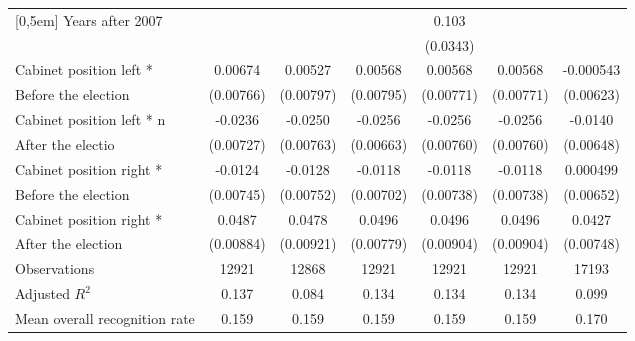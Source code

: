 \begin{table}[!ht]
\begin{tabular}{l*{6}{c}}
[0,5em]
Years after 2007    &                     &                     &                     &       0.103\sym{**} &                     &                     \\
                    &                     &                     &                     &    (0.0343)         &                     &                     \\
[0,5em]
Cabinet position left * &     0.00674         &     0.00527         &     0.00568         &     0.00568         &     0.00568         &   -0.000543         \\
Before the election                    &   (0.00766)         &   (0.00797)         &   (0.00795)         &   (0.00771)         &   (0.00771)         &   (0.00623)         \\
[0,5em]
Cabinet position left * n&     -0.0236\sym{**} &     -0.0250\sym{**} &     -0.0256\sym{***}&     -0.0256\sym{**} &     -0.0256\sym{**} &     -0.0140\sym{*}  \\
After the electio                    &   (0.00727)         &   (0.00763)         &   (0.00663)         &   (0.00760)         &   (0.00760)         &   (0.00648)         \\
[0,5em]
Cabinet position right * &     -0.0124         &     -0.0128         &     -0.0118         &     -0.0118         &     -0.0118         &    0.000499         \\
Before the election                    &   (0.00745)         &   (0.00752)         &   (0.00702)         &   (0.00738)         &   (0.00738)         &   (0.00652)         \\
[0,5em]
Cabinet position right *&      0.0487\sym{***}&      0.0478\sym{***}&      0.0496\sym{***}&      0.0496\sym{***}&      0.0496\sym{***}&      0.0427\sym{***}\\
 After the election                    &   (0.00884)         &   (0.00921)         &   (0.00779)         &   (0.00904)         &   (0.00904)         &   (0.00748)         \\
\hline
Observations        &       12921         &       12868         &       12921         &       12921         &       12921         &       17193         \\
Adjusted \(R^{2}\)  &       0.137         &       0.084         &       0.134         &       0.134         &       0.134         &       0.099         \\
Mean overall recognition rate&       0.159         &       0.159         &       0.159         &       0.159         &       0.159         &       0.170         \\

\end{tabular}
\end{table}
